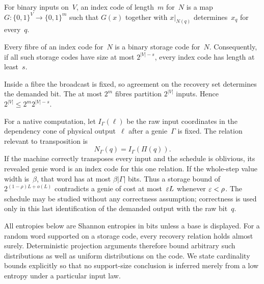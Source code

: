 \begin{definition}
For binary inputs on~$V$, an index code of length~$m$ for~$N$ is a map $G:\{0,1\}^V\to\{0,1\}^m$ such that $G(x)$ together with $x|_{N(q)}$ determines~$x_q$ for every~$q$.
\end{definition}

\begin{lemma}\label{lem:pre-fibre}
Every fibre of an index code for~$N$ is a binary storage code for~$N$. Consequently, if all such storage codes have size at most $2^{|V|-s}$, every index code has length at least~$s$.
\end{lemma}
\begin{outline}
Inside a fibre the broadcast is fixed, so agreement on the recovery set determines the demanded bit. The at most $2^m$ fibres partition $2^{|V|}$ inputs. Hence $2^{|V|}\le2^m2^{|V|-s}$.
\end{outline}

For a native computation, let $I_\Gamma(\ell)$ be the raw input coordinates in the dependency cone of physical output~$\ell$ after a genie~$\Gamma$ is fixed. The relation relevant to transposition is
\begin{equation}\label{eq:transpose-relation}
 N_\Gamma(q)=I_\Gamma(\Pi(q)).
\end{equation}
If the machine correctly transposes every input and the schedule is oblivious, its revealed genie word is an index code for this one relation. If the whole-step value width is~$\beta$, that word has at most $\beta|\Gamma|$ bits. Thus a storage bound of $2^{(1-\rho)L+o(L)}$ contradicts a genie of cost at most~$\varepsilon L$ whenever $\varepsilon<\rho$. The schedule may be studied without any correctness assumption; correctness is used only in this last identification of the demanded output with the raw bit~$q$.

All entropies below are Shannon entropies in bits unless a base is displayed. For a random word supported on a storage code, every recovery relation holds almost surely. Deterministic projection arguments therefore bound arbitrary such distributions as well as uniform distributions on the code. We state cardinality bounds explicitly so that no support-size conclusion is inferred merely from a low entropy under a particular input law.
